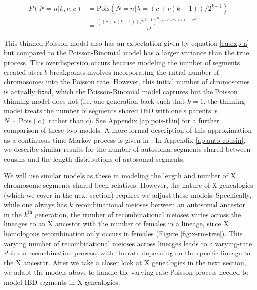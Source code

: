 \documentclass[9pt,twocolumn,twoside]{gsajnl}
\begin{document}
\begin{align}
\label{eq:auto-segment-number}
  P(N = n | k, \nu, c) &= \text{Pois}(N = n | \lambda = (c + \nu (k-1))/2^{k-1}) \nonumber \\
                       &= \frac{((c + \nu (k-1))/2^{k-1})^n  e^{- (c + \nu (k-1))/{2^{k - 1}}}}{n!}
\end{align}

This thinned Poisson model also has an expectation given by equation
\eqref{eq:exp-n} but compared to the Poisson-Binomial model has a larger
variance than the true process. This overdispersion occurs because modeling the
number of segments created after $b$ breakpoints involves incorporating the
initial number of chromosomes into the Poisson rate. However, this initial
number of chromosomes is actually fixed, which the Poisson-Binomial model
captures but the Poisson thinning model does not (i.e. one generation back such
that $k=1$, the thinning model treats the number of segments shared IBD with
one's parents is $N \sim \text{Pois}(c)$ rather than $c$). See Appendix
\ref{ap:pois-thin} for a further comparison of these two models. A more formal
description of this approximation as a continuous-time Markov process is given
in \citet{thomas:1994hg}. In Appendix \ref{ap:auto-cousin}, we describe
similar results for the number of autosomal segments shared between cousins and
the length distributions of autosomal segments.

We will use similar models as these in modeling the length and number of X
chromosome segments shared been relatives. However, the nature of X genealogies
(which we cover in the next section) requires we adjust these models.
Specifically, while one always has $k$ recombinational meioses between an
autosomal ancestor in the $k^\text{th}$ generation, the number of
recombinational meioses varies across the lineages to an X ancestor with the
number of females in a lineage, since X homologous recombination only occurs in
females (Figure \ref{fig:x-rm-tree}). This varying number of recombinational
meioses across lineages leads to a varying-rate Poisson recombination process,
with the rate depending on the specific lineage to the X ancestor. After we
take a closer look at X genealogies in the next section, we adapt the models
above to handle the varying-rate Poisson process needed to model IBD segments
in X genealogies.
\end{document}

